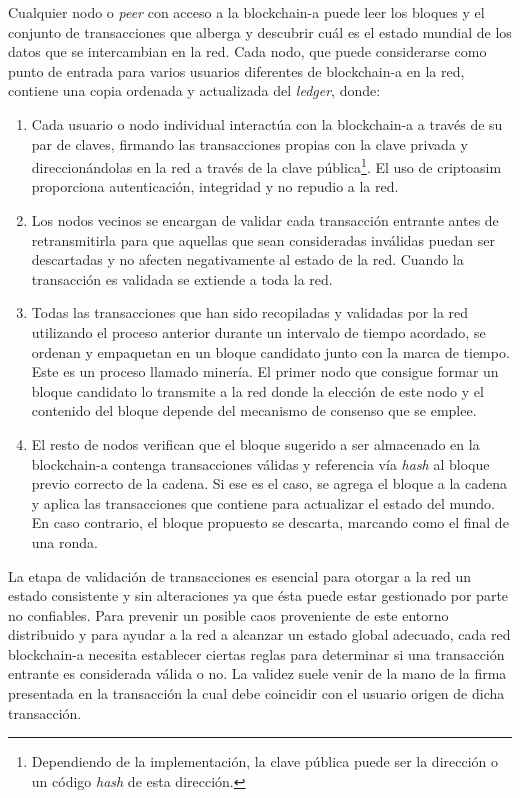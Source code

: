 \documentclass[12pt,a4paper, twoside]{report}
\begin{document}
	Cualquier nodo o \textit{peer} con acceso a la \gls{blockchain-a} puede leer los bloques y el conjunto de transacciones que alberga y descubrir cuál es el estado mundial de los datos que se intercambian en la red. Cada nodo, que puede considerarse como punto de entrada para varios usuarios diferentes de \gls{blockchain-a} en la red, contiene una copia ordenada y actualizada del \textit{ledger}, donde:

 \begin{enumerate}
 	\item Cada usuario o nodo individual interactúa con la \gls{blockchain-a} a través de su par de claves, firmando las transacciones propias con la clave privada y direccionándolas en la red a través de la clave pública\footnote{Dependiendo de la implementación, la clave pública puede ser la dirección o un código \textit{hash} de esta dirección.}. El uso de \gls{criptoasim} proporciona autenticación, integridad y no repudio a la red.
 	\item Los nodos vecinos se encargan de validar cada transacción entrante antes de retransmitirla para que aquellas que sean consideradas inválidas puedan ser descartadas y no afecten negativamente al estado de la red. Cuando la transacción es validada se extiende a toda la red. 
 	\item Todas las transacciones que han sido recopiladas y validadas por la red utilizando el proceso anterior durante un intervalo de tiempo acordado, se ordenan y empaquetan en un bloque candidato junto con la marca de tiempo. Este es un proceso llamado minería. El primer nodo que consigue formar un bloque candidato lo transmite a la red donde la elección de este nodo y el contenido del bloque depende del mecanismo de consenso que se emplee. 
 	\item El resto de nodos verifican que el bloque sugerido a ser almacenado en la \gls{blockchain-a} contenga transacciones válidas y referencia vía \textit{hash} al bloque previo correcto de la cadena. Si ese es el caso, se agrega el bloque a la cadena y aplica las transacciones que contiene para actualizar el estado del mundo. En caso contrario, el bloque propuesto se descarta, marcando como el final de una ronda.
  \end{enumerate}
 	 
	La etapa de validación de transacciones es esencial para otorgar a la red un estado consistente y sin alteraciones ya que ésta puede estar gestionado por parte no confiables. Para prevenir un posible caos proveniente de este entorno distribuido y para ayudar a la red a alcanzar un estado global adecuado, cada red \gls{blockchain-a} necesita establecer ciertas reglas para determinar si una transacción entrante es considerada válida o no. La validez suele venir de la mano de la firma presentada en la transacción la cual debe coincidir con el usuario origen de dicha transacción.
\end{document}
